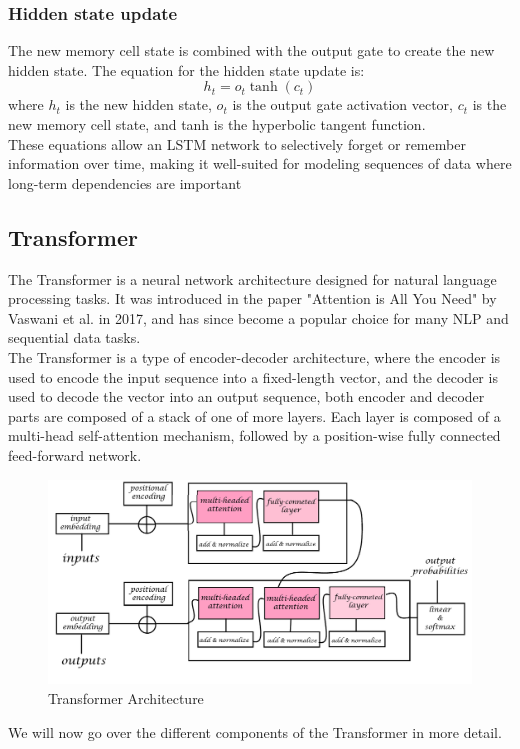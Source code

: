 \documentclass[a4paper]{sapthesis}
\begin{document}
\subsubsection{Hidden state update}
The new memory cell state is combined with the output gate
 to create the new hidden state. The equation for the hidden state update is:
 \begin{equation}
  h_t = o_t \tanh(c_t)
  \end{equation}
where $h_t$ is the new hidden state, $o_t$ is the output gate activation vector,
 $c_t$ is the new memory cell state, and tanh is the hyperbolic tangent function.\newline \\
These equations allow an LSTM network to selectively forget or remember
 information over time, making it well-suited for modeling sequences of
  data where long-term dependencies are important

\subsection{Transformer}
The Transformer is a neural network architecture designed for natural
 language processing tasks. It was introduced in the paper "Attention
  is All You Need" by Vaswani et al. in 2017\cite{attention}, and has since become 
  a popular choice for many NLP and sequential data tasks.\newline \\
 The Transformer
   is a type of encoder-decoder architecture, where the encoder is used 
   to encode the input sequence into a fixed-length vector, and the 
   decoder is used to decode the vector into an output sequence, both 
   encoder and decoder parts are composed of a stack of one of more layers.
    Each layer is composed of a multi-head self-attention mechanism, followed 
  by a position-wise fully connected feed-forward network.\newline
\begin{figure}[h]
  \includegraphics[scale=0.42]{transformer}
  \centering
  \caption{Transformer Architecture}\label{fig:transformer}
  \end{figure}
We will now go over the different components of the Transformer in more
 detail.
\end{document}
